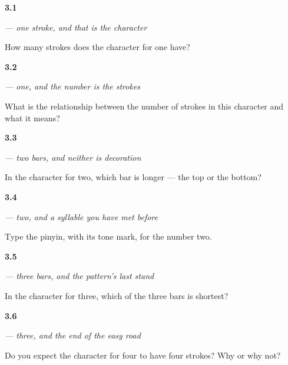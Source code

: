 \noindent\begin{minipage}[t]{\linewidth}
\raggedright
\hypertarget{review-ZH-W03-yi-strokes}{\textbf{3.1}} \emph{ — one stroke, and that is the character}\par
\small How many strokes does the character for one have?
\end{minipage}\par\medskip

\noindent\begin{minipage}[t]{\linewidth}
\raggedright
\hypertarget{review-ZH-C03-yi-count}{\textbf{3.2}} \emph{ — one, and the number is the strokes}\par
\small What is the relationship between the number of strokes in this character and what it means?
\end{minipage}\par\medskip

\noindent\begin{minipage}[t]{\linewidth}
\raggedright
\hypertarget{review-ZH-W03-er-longer}{\textbf{3.3}} \emph{ — two bars, and neither is decoration}\par
\small In the character for two, which bar is longer — the top or the bottom?
\end{minipage}\par\medskip

\noindent\begin{minipage}[t]{\linewidth}
\raggedright
\hypertarget{review-ZH-C03-er-tone}{\textbf{3.4}} \emph{ — two, and a syllable you have met before}\par
\small Type the pinyin, with its tone mark, for the number two.
\end{minipage}\par\medskip

\noindent\begin{minipage}[t]{\linewidth}
\raggedright
\hypertarget{review-ZH-W03-san-middle}{\textbf{3.5}} \emph{ — three bars, and the pattern's last stand}\par
\small In the character for three, which of the three bars is shortest?
\end{minipage}\par\medskip

\noindent\begin{minipage}[t]{\linewidth}
\raggedright
\hypertarget{review-ZH-C03-san-next}{\textbf{3.6}} \emph{ — three, and the end of the easy road}\par
\small Do you expect the character for four to have four strokes? Why or why not?
\end{minipage}\par\medskip

